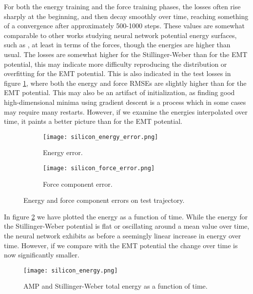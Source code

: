For both the energy training and the force training phases, the 
losses often rise sharply at the beginning, and then decay smoothly over time,
reaching something of a convergence after approximately 500-1000 steps.
These values are somewhat comparable to other works studying neural network
potential energy surfaces, such as \cite{stende2017constructing}\cite{
    treider2017speeding}\cite{khorshidi2016amp}\cite{PhysRevLett.120.143001},
at least in terms of the forces, though the energies are higher than usual.
The losses are somewhat higher for the Stillinger-Weber than for the
EMT potential, this may indicate more difficulty reproducing the distribution
or overfitting for the EMT potential.
This is also indicated in the test losses in figure \ref{fig:silicon-error},
where both the energy and force RMSEs are slightly higher than for the
EMT potential. This may also be an artifact of initialization, as finding
good high-dimensional minima using gradient descent 
is a process which in some cases may require many restarts.
However, if we examine the energies interpolated over time,
it paints a better picture than for the EMT potential.

\begin{figure}[H]
\begin{adjustbox}{max width=1.2\linewidth,center}
\centering
  \begin{subfigure}[b]{0.55\textwidth}
      \texttt{[image: silicon\_energy\_error.png]}
      \caption{Energy error.}
  \end{subfigure}
  \hfill
  \begin{subfigure}[b]{0.55\textwidth}
      \texttt{[image: silicon\_force\_error.png]}
      \caption{Force component error.}
  \end{subfigure}
\end{adjustbox}
    \caption{Energy and force component errors on test trajectory.}
    \label{fig:silicon-error}
\end{figure}

In figure \ref{fig:silicon-energy} we have plotted the energy as a function
of time. While the energy for the Stillinger-Weber potential 
is flat or oscillating around a mean value over time,
the neural network exhibits as before a seemingly
linear increase in energy over time.
However, if we compare with the EMT potential the change over time 
is now significantly smaller.

\begin{figure}[H]
    \centering
    \texttt{[image: silicon\_energy.png]}
    \caption{AMP and Stillinger-Weber total energy as a function of time.}
    \label{fig:silicon-energy}
\end{figure}

